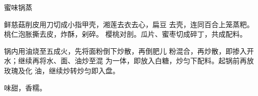 \begin{recipe}[八宝锅蒸]{蜜味锅蒸}

\ingredients


\cooking

\step 	鲜慈菇削皮用刀切成小指甲壳，湘莲去衣去心，扁豆 去壳，连同百合上笼蒸粑。桃仁泡胀撕去皮，炸酥，剁碎。 樱桃对剖。瓜片、蜜枣切成碎丁，共成配料。

\step 	锅内用油烧至五成火，先将面粉倒下炒散，再倒肥儿 粉混合，再炒散，即掺入开水；继续再将水、面、油炒至混 为一体，即放入白糖，炒匀下配料。起锅前再放玫瑰及化 油，继续炒转炒匀即入盘。

\notes

味甜，香糯。

\end{recipe}

